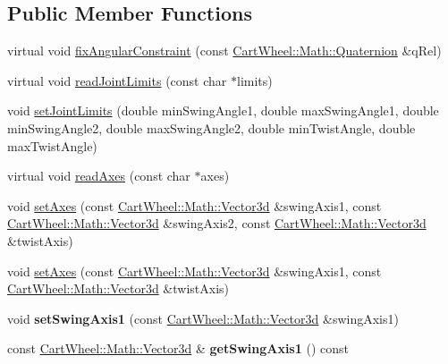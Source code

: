 \subsection*{Public Member Functions}
\begin{DoxyCompactItemize}
\item 
virtual void \hyperlink{classCartWheel_1_1Physics_1_1BallInSocketJoint_a4d40c7d01cbb85ff85f5177cbb19a9ff}{fixAngularConstraint} (const \hyperlink{classCartWheel_1_1Math_1_1Quaternion}{CartWheel::Math::Quaternion} \&qRel)
\item 
virtual void \hyperlink{classCartWheel_1_1Physics_1_1BallInSocketJoint_af1a97e525c526eac4b346d5e305ebb9c}{readJointLimits} (const char $\ast$limits)
\item 
void \hyperlink{classCartWheel_1_1Physics_1_1BallInSocketJoint_a15f62913ee27eca01320ea131edf5afe}{setJointLimits} (double minSwingAngle1, double maxSwingAngle1, double minSwingAngle2, double maxSwingAngle2, double minTwistAngle, double maxTwistAngle)
\item 
virtual void \hyperlink{classCartWheel_1_1Physics_1_1BallInSocketJoint_a7d4d2b89877b4bc9afbb9971e2c1bb67}{readAxes} (const char $\ast$axes)
\item 
void \hyperlink{classCartWheel_1_1Physics_1_1BallInSocketJoint_a3b1ee8f3e4e5e4ebfd3723c538c0a714}{setAxes} (const \hyperlink{classCartWheel_1_1Math_1_1Vector3d}{CartWheel::Math::Vector3d} \&swingAxis1, const \hyperlink{classCartWheel_1_1Math_1_1Vector3d}{CartWheel::Math::Vector3d} \&swingAxis2, const \hyperlink{classCartWheel_1_1Math_1_1Vector3d}{CartWheel::Math::Vector3d} \&twistAxis)
\item 
void \hyperlink{classCartWheel_1_1Physics_1_1BallInSocketJoint_af240d9745050209ff29d407678c59930}{setAxes} (const \hyperlink{classCartWheel_1_1Math_1_1Vector3d}{CartWheel::Math::Vector3d} \&swingAxis1, const \hyperlink{classCartWheel_1_1Math_1_1Vector3d}{CartWheel::Math::Vector3d} \&twistAxis)
\item 
\hypertarget{classCartWheel_1_1Physics_1_1BallInSocketJoint_af326fbf1d14a069338f6f1f361611af0}{
void {\bfseries setSwingAxis1} (const \hyperlink{classCartWheel_1_1Math_1_1Vector3d}{CartWheel::Math::Vector3d} \&swingAxis1)}
\label{classCartWheel_1_1Physics_1_1BallInSocketJoint_af326fbf1d14a069338f6f1f361611af0}

\item 
\hypertarget{classCartWheel_1_1Physics_1_1BallInSocketJoint_a0fff26a947ed012e2f0622469021788a}{
const \hyperlink{classCartWheel_1_1Math_1_1Vector3d}{CartWheel::Math::Vector3d} \& {\bfseries getSwingAxis1} () const }
\label{classCartWheel_1_1Physics_1_1BallInSocketJoint_a0fff26a947ed012e2f0622469021788a}


\end{DoxyCompactItemize}

